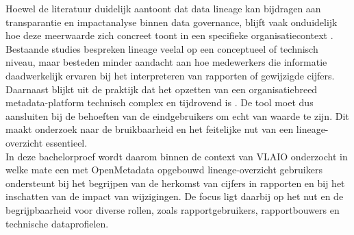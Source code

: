 Hoewel de literatuur duidelijk aantoont dat data lineage kan bijdragen aan transparantie en impactanalyse binnen data governance, blijft vaak onduidelijk hoe deze meerwaarde zich concreet toont in een specifieke organisatiecontext \autocite{verma2024tracing,bernardo2024data}. Bestaande studies bespreken lineage veelal op een conceptueel of technisch niveau, maar besteden minder aandacht aan hoe medewerkers die informatie daadwerkelijk ervaren bij het interpreteren van rapporten of gewijzigde cijfers. Daarnaast blijkt uit de praktijk dat het opzetten van een organisatiebreed metadata-platform technisch complex en tijdrovend is \autocite{eichler2021enterprise}. De tool moet dus aansluiten bij de behoeften van de eindgebruikers om echt van waarde te zijn. Dit maakt onderzoek naar de bruikbaarheid en het feitelijke nut van een lineage-overzicht essentieel.\\

In deze bachelorproef wordt daarom binnen de context van VLAIO onderzocht in welke mate een met OpenMetadata opgebouwd lineage-overzicht gebruikers ondersteunt bij het begrijpen van de herkomst van cijfers in rapporten en bij het inschatten van de impact van wijzigingen. De focus ligt daarbij op het nut en de begrijpbaarheid voor diverse rollen, zoals rapportgebruikers, rapportbouwers en technische dataprofielen.\\